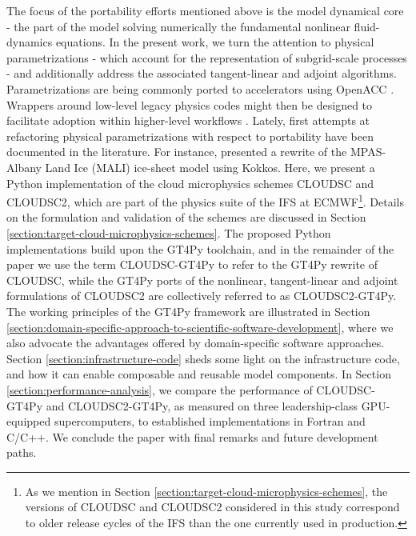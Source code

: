 \documentclass[gmd,manuscript,online]{copernicus}
\theoremstyle{theorem}
\theoremstyle{definition}
\theoremstyle{remark}
\theoremstyle{proposition}
\begin{document}
	The focus of the portability efforts mentioned above is the model dynamical core - the part of the model solving numerically the fundamental nonlinear fluid-dynamics equations. In the present work, we turn the attention to physical parametrizations - which account for the representation of subgrid-scale processes - and additionally address the associated tangent-linear and adjoint algorithms. Parametrizations are being commonly ported to accelerators using OpenACC \citep[e.g., ][]{fuhrer14, yang19, kim21}. Wrappers around low-level legacy physics codes might then be designed to facilitate adoption within higher-level workflows \citep{monteiro18, mcgibbon21}. Lately, first attempts at refactoring physical parametrizations with respect to portability have been documented in the literature. For instance, \citet{watkins23} presented a rewrite of the MPAS-Albany Land Ice (MALI) ice-sheet model using Kokkos. Here, we present a Python implementation of the cloud microphysics schemes CLOUDSC and CLOUDSC2, which are part of the physics suite of the IFS at ECMWF\footnote{As we mention in Section \ref{section:target-cloud-microphysics-schemes}, the versions of CLOUDSC and CLOUDSC2 considered in this study correspond to older release cycles of the IFS than the one currently used in production.}. Details on the formulation and validation of the schemes are discussed in Section \ref{section:target-cloud-microphysics-schemes}. The proposed Python implementations build upon the GT4Py toolchain, and in the remainder of the paper we use the term CLOUDSC-GT4Py to refer to the GT4Py rewrite of CLOUDSC, while the GT4Py ports of the nonlinear, tangent-linear and adjoint formulations of CLOUDSC2 are collectively referred to as CLOUDSC2-GT4Py. The working principles of the GT4Py framework are illustrated in Section \ref{section:domain-specific-approach-to-scientific-software-development}, where we also advocate the advantages offered by domain-specific software approaches. Section \ref{section:infrastructure-code} sheds some light on the infrastructure code, and how it can enable composable and reusable model components. In Section \ref{section:performance-analysis}, we compare the performance of CLOUDSC-GT4Py and CLOUDSC2-GT4Py, as measured on three leadership-class GPU-equipped supercomputers, to established implementations in Fortran and C/C++. We conclude the paper with final remarks and future development paths.

\end{document}
